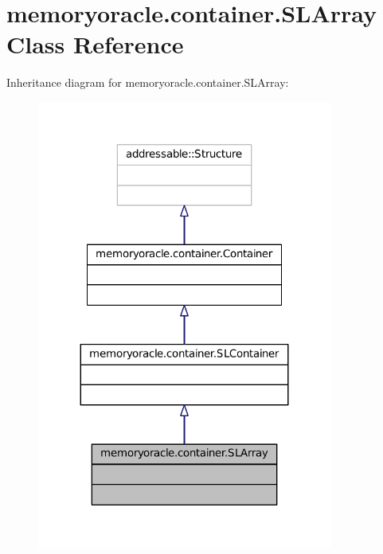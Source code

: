 \hypertarget{classmemoryoracle_1_1container_1_1SLArray}{}\section{memoryoracle.\+container.\+S\+L\+Array Class Reference}
\label{classmemoryoracle_1_1container_1_1SLArray}


Inheritance diagram for memoryoracle.\+container.\+S\+L\+Array\+:\nopagebreak
\begin{figure}[H]
\begin{center}
\leavevmode
\includegraphics[width=275pt]{classmemoryoracle_1_1container_1_1SLArray__inherit__graph}
\end{center}
\end{figure}


